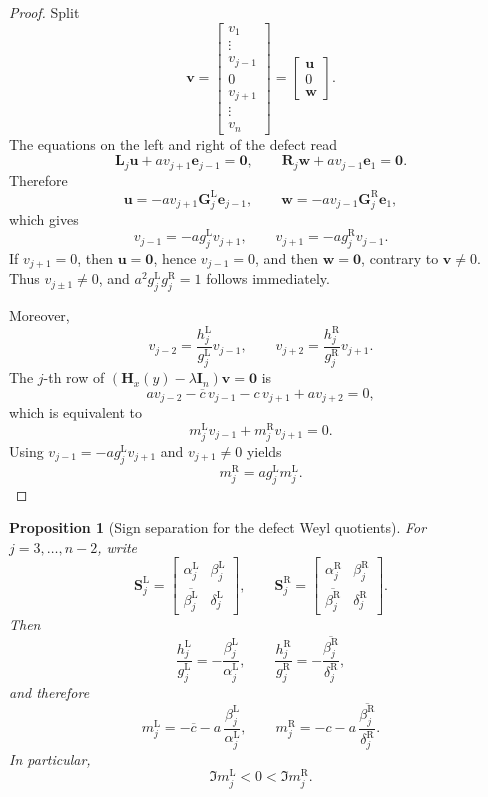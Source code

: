 \documentclass[11pt]{article}
\numberwithin{equation}{section}
\newtheorem{proposition}[theorem]{Proposition}
\newcommand{\I}{\mathbf I}
\newcommand{\Hmat}{\mathbf H}
\begin{document}
\begin{proof}
Split
\[
\bm v=
\begin{bmatrix}
v_1\\
\vdots\\
v_{j-1}\\
0\\
v_{j+1}\\
\vdots\\
v_n
\end{bmatrix}
=
\begin{bmatrix}
\bm u\\
0\\
\bm w
\end{bmatrix}.
\]
The equations on the left and right of the defect read
\[
\mathbf L_j\bm u+av_{j+1}\bm e_{j-1}=\bm0,
\qquad
\mathbf R_j\bm w+av_{j-1}\bm e_1=\bm0.
\]
Therefore
\[
\bm u=-av_{j+1}\mathbf G_j^{\mathrm L}\bm e_{j-1},
\qquad
\bm w=-av_{j-1}\mathbf G_j^{\mathrm R}\bm e_1,
\]
which gives
\[
v_{j-1}=-ag_j^{\mathrm L}v_{j+1},
\qquad
v_{j+1}=-ag_j^{\mathrm R}v_{j-1}.
\]
If \(v_{j+1}=0\), then \(\bm u=\bm0\), hence \(v_{j-1}=0\), and then \(\bm w=\bm0\),
contrary to \(\bm v\neq0\).  Thus \(v_{j\pm1}\neq0\), and
\(a^2g_j^{\mathrm L}g_j^{\mathrm R}=1\) follows immediately.

Moreover,
\[
v_{j-2}=\frac{h_j^{\mathrm L}}{g_j^{\mathrm L}}v_{j-1},
\qquad
v_{j+2}=\frac{h_j^{\mathrm R}}{g_j^{\mathrm R}}v_{j+1}.
\]
The \(j\)-th row of
\((\Hmat_x(y)-\lambda\I_n)\bm v=\bm0\) is
\[
av_{j-2}-\overline c\,v_{j-1}-c\,v_{j+1}+av_{j+2}=0,
\]
which is equivalent to
\[
m_j^{\mathrm L}v_{j-1}+m_j^{\mathrm R}v_{j+1}=0.
\]
Using \(v_{j-1}=-ag_j^{\mathrm L}v_{j+1}\) and \(v_{j+1}\neq0\) yields
\[
m_j^{\mathrm R}=ag_j^{\mathrm L}m_j^{\mathrm L}.
\]
\end{proof}

\begin{proposition}[Sign separation for the defect Weyl quotients]
\label{prop:sign}
For \(j=3,\dots,n-2\), write
\[
\mathbf S_j^{\mathrm L}
=
\begin{bmatrix}
\alpha_j^{\mathrm L} & \beta_j^{\mathrm L}\\
\overline{\beta_j^{\mathrm L}} & \delta_j^{\mathrm L}
\end{bmatrix},
\qquad
\mathbf S_j^{\mathrm R}
=
\begin{bmatrix}
\alpha_j^{\mathrm R} & \beta_j^{\mathrm R}\\
\overline{\beta_j^{\mathrm R}} & \delta_j^{\mathrm R}
\end{bmatrix}.
\]
Then
\[
\frac{h_j^{\mathrm L}}{g_j^{\mathrm L}}
=
-\frac{\beta_j^{\mathrm L}}{\alpha_j^{\mathrm L}},
\qquad
\frac{h_j^{\mathrm R}}{g_j^{\mathrm R}}
=
-\frac{\overline{\beta_j^{\mathrm R}}}{\delta_j^{\mathrm R}},
\]
and therefore
\[
m_j^{\mathrm L}
=
-\overline c-a\,\frac{\beta_j^{\mathrm L}}{\alpha_j^{\mathrm L}},
\qquad
m_j^{\mathrm R}
=
-c-a\,\frac{\overline{\beta_j^{\mathrm R}}}{\delta_j^{\mathrm R}}.
\]
In particular,
\[
\Im m_j^{\mathrm L}<0<\Im m_j^{\mathrm R}.
\]
\end{proposition}
\end{document}
